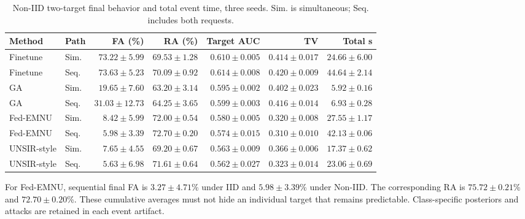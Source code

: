 \begin{table}[H]\centering\scriptsize\setlength{\tabcolsep}{3pt}

\caption{Non-IID two-target final behavior and total event time, three seeds. Sim. is simultaneous; Seq. includes both requests.}

\label{tab:sequence-noniid}

\begin{tabular}{llrrrrr}\toprule Method & Path & FA (\%) & RA (\%) & Target AUC & TV & Total s\\\midrule

Finetune & Sim. & $73.22 \pm 5.99$ & $69.53 \pm 1.28$ & $0.610 \pm 0.005$ & $0.414 \pm 0.017$ & $24.66 \pm 6.00$\\

Finetune & Seq. & $73.63 \pm 5.23$ & $70.09 \pm 0.92$ & $0.614 \pm 0.008$ & $0.420 \pm 0.009$ & $44.64 \pm 2.14$\\

GA & Sim. & $19.65 \pm 7.60$ & $63.20 \pm 3.14$ & $0.595 \pm 0.002$ & $0.402 \pm 0.023$ & $5.92 \pm 0.16$\\

GA & Seq. & $31.03 \pm 12.73$ & $64.25 \pm 3.65$ & $0.599 \pm 0.003$ & $0.416 \pm 0.014$ & $6.93 \pm 0.28$\\

Fed-EMNU & Sim. & $8.42 \pm 5.99$ & $72.00 \pm 0.54$ & $0.580 \pm 0.005$ & $0.320 \pm 0.008$ & $27.55 \pm 1.17$\\

Fed-EMNU & Seq. & $5.98 \pm 3.39$ & $72.70 \pm 0.20$ & $0.574 \pm 0.015$ & $0.310 \pm 0.010$ & $42.13 \pm 0.06$\\

UNSIR-style & Sim. & $7.65 \pm 4.55$ & $69.20 \pm 0.67$ & $0.563 \pm 0.009$ & $0.366 \pm 0.006$ & $17.37 \pm 0.62$\\

UNSIR-style & Seq. & $5.63 \pm 6.98$ & $71.61 \pm 0.64$ & $0.562 \pm 0.027$ & $0.323 \pm 0.014$ & $23.06 \pm 0.69$\\

\bottomrule\end{tabular}\end{table}

For Fed-EMNU, sequential final FA is $3.27 \pm 4.71$\% under IID and $5.98 \pm 3.39$\% under Non-IID. The corresponding RA is $75.72 \pm 0.21$\% and $72.70 \pm 0.20$\%. These cumulative averages must not hide an individual target that remains predictable. Class-specific posteriors and attacks are retained in each event artifact.


